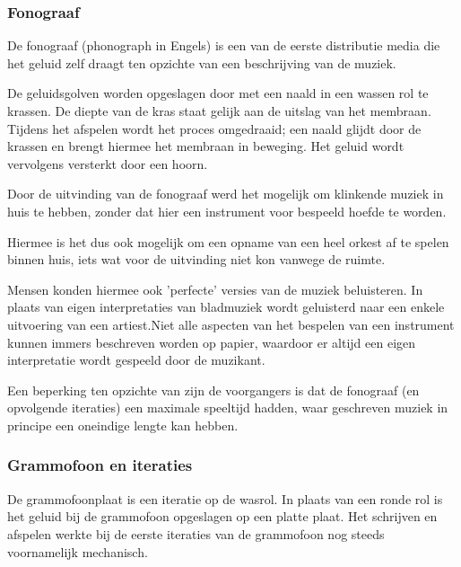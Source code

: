 \subsubsection*{Fonograaf}
De fonograaf (phonograph in Engels) is een van de eerste distributie media die het geluid zelf draagt ten opzichte van een beschrijving van de muziek.

De geluidsgolven worden opgeslagen door met een naald in een wassen rol te krassen. De diepte van de kras staat gelijk aan de uitslag van het membraan. Tijdens het afspelen wordt het proces omgedraaid; een naald glijdt door de krassen en brengt hiermee het membraan in beweging. Het geluid wordt vervolgens versterkt door een hoorn.

Door de uitvinding van de fonograaf werd het mogelijk om klinkende muziek in huis te hebben, zonder dat hier een instrument voor bespeeld hoefde te worden.

Hiermee is het dus ook mogelijk om een opname van een heel orkest af te spelen binnen huis, iets wat voor de uitvinding niet kon vanwege de ruimte.

Mensen konden hiermee ook 'perfecte' versies van de muziek beluisteren. In plaats van eigen interpretaties van bladmuziek wordt geluisterd naar een enkele uitvoering van een artiest.Niet alle aspecten van het bespelen van een instrument kunnen immers beschreven worden op papier, waardoor er altijd een eigen interpretatie wordt gespeeld door de muzikant.

Een beperking ten opzichte van zijn de voorgangers is dat de fonograaf (en opvolgende iteraties) een maximale speeltijd hadden, waar geschreven muziek in principe een oneindige lengte kan hebben.



\subsubsection*{Grammofoon en iteraties}
De grammofoonplaat is een iteratie op de wasrol. In plaats van een ronde rol is het geluid bij de grammofoon opgeslagen op een platte plaat. Het schrijven en afspelen werkte bij de eerste iteraties van de grammofoon nog steeds voornamelijk mechanisch.

